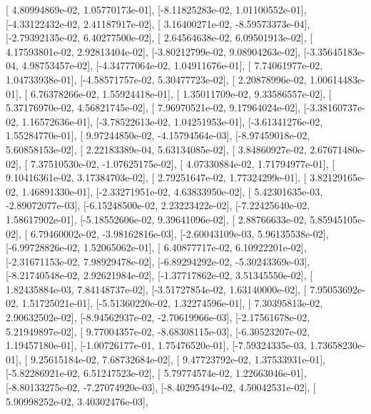 \documentclass{article}
\begin{document}
       [ 4.80994869e-02,  1.05770173e-01],
       [-8.11825283e-02,  1.01100552e-01],
       [-4.33122432e-02,  2.41187917e-02],
       [ 3.16400271e-02, -8.59573373e-04],
       [-2.79392135e-02,  6.40277500e-02],
       [ 2.64564638e-02,  6.09501913e-02],
       [ 4.17593801e-02,  2.92813404e-02],
       [-3.80212799e-02,  9.08904263e-02],
       [-3.35645183e-04,  4.98753457e-02],
       [-4.34777064e-02,  1.04911676e-01],
       [ 7.74061977e-02,  1.04733938e-01],
       [-4.58571757e-02,  5.30477723e-02],
       [ 2.20878996e-02,  1.00614483e-01],
       [ 6.76378266e-02,  1.55924418e-01],
       [ 1.35011709e-02,  9.33586557e-02],
       [ 5.37176970e-02,  4.56821745e-02],
       [ 7.96970521e-02,  9.17964024e-02],
       [-3.38160737e-02,  1.16572636e-01],
       [-3.78522613e-02,  1.04251953e-01],
       [-3.61341276e-02,  1.55284770e-01],
       [ 9.97244850e-02, -4.15794564e-03],
       [-8.97459018e-02,  5.60858153e-02],
       [ 2.22183389e-04,  5.63134085e-02],
       [ 3.84860927e-02,  2.67671480e-02],
       [ 7.37510530e-02, -1.07625175e-02],
       [ 4.07330884e-02,  1.71794977e-01],
       [ 9.10416361e-02,  3.17384703e-02],
       [ 2.79251647e-02,  1.77324299e-01],
       [ 3.82129165e-02,  1.46891330e-01],
       [-2.33271951e-02,  4.63833950e-02],
       [ 5.42301635e-03, -2.89072077e-03],
       [-6.15248500e-02,  2.23223422e-02],
       [-7.22425640e-02,  1.58617902e-01],
       [-5.18552606e-02,  9.39641096e-02],
       [ 2.88766633e-02,  5.85945105e-02],
       [ 6.79460002e-02, -3.98162816e-03],
       [-2.60043109e-03,  5.96135538e-02],
       [-6.99728826e-02,  1.52065062e-01],
       [ 6.40877717e-02,  6.10922201e-02],
       [-2.31671153e-02,  7.98929478e-02],
       [-6.89294292e-02, -5.30243369e-03],
       [-8.21740548e-02,  2.92621984e-02],
       [-1.37717862e-02,  3.51345550e-02],
       [ 1.82435884e-03,  7.84148737e-02],
       [-3.51727854e-02,  1.63140000e-02],
       [ 7.95053692e-02,  1.51725021e-01],
       [-5.51360220e-02,  1.32274596e-01],
       [ 7.30395813e-02,  2.90632502e-02],
       [-8.94562937e-02, -2.70619966e-03],
       [-2.17561678e-02,  5.21949897e-02],
       [ 9.77004357e-02, -8.68308115e-03],
       [-6.30523207e-02,  1.19457180e-01],
       [-1.00726177e-01,  1.75476520e-01],
       [-7.59324335e-03,  1.73658230e-01],
       [ 9.25615184e-02,  7.68732684e-02],
       [ 9.47723792e-02,  1.37533931e-01],
       [-5.82286921e-02,  6.51247523e-02],
       [ 5.79774574e-02,  1.22663046e-01],
       [-8.80133275e-02, -7.27074920e-03],
       [-8.40295494e-02,  4.50042531e-02],
       [ 5.90998252e-02,  3.40302476e-03],
\end{document}
